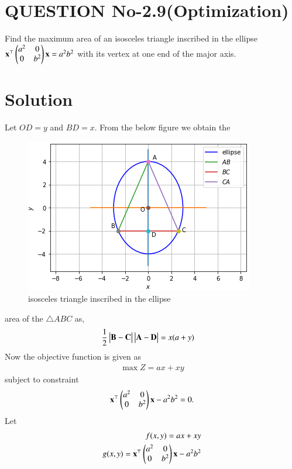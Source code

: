 \documentclass[journal,12pt,twocolumn]{IEEEtran}
\begin{document}
%
\section{QUESTION No-2.9(Optimization)}
Find the maximum area of an isosceles triangle inscribed in the ellipse $\mathbf{x}^{\top}\begin{pmatrix}a^2 & 0 \\ 0 & b^2\end{pmatrix}\mathbf{x} = a^2b^2$
with its vertex at one end of the major axis.
\section{Solution}
Let $OD=y$ and $BD=x$. From the below figure we obtain the
\begin{figure}[!ht]
\centering
\includegraphics[width=\columnwidth]{isosceles.PNG}
\caption{isosceles triangle inscribed in the ellipse}
\label{fig:Graph}	
\end{figure}
area of the $\triangle ABC$ as, 
\begin{align}
    \frac{1}{2}\begin{vmatrix}\mathbf{B}-\mathbf{C}\end{vmatrix}\begin{vmatrix}\mathbf{A}-\mathbf{D}\end{vmatrix} &=x(a+y)
\end{align}
Now the objective function is given as
\begin{align}
    \max Z = ax+xy
\end{align}
subject to constraint
\begin{align}
    \mathbf{x}^{\top}\begin{pmatrix}a^2 & 0 \\ 0 & b^2\end{pmatrix}\mathbf{x}-a^2b^2=0.\label{eq6}
\end{align}
Let
\begin{align}
    f(x,y)=ax+xy \\
    g(x,y)=\mathbf{x}^{\top}\begin{pmatrix}a^2 & 0 \\ 0 & b^2\end{pmatrix}\mathbf{x}-a^2b^2
\end{align}
\end{document}
